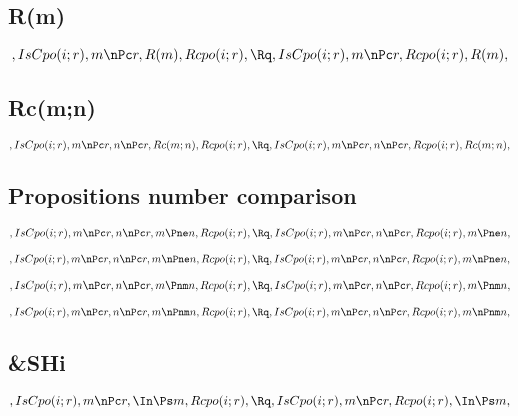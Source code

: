 \bigskip
\bigskip
\subsection{R(m)}
\[, IsCpo(i;r), m \nPc r, R(m), Rcpo(i;r), \Rq ,IsCpo(i;r), m \nPc r, Rcpo(i;r), R(m), \]


\bigskip
\bigskip
\subsection{Rc(m;n)}
\[, IsCpo(i;r), m \nPc r, n \nPc r, Rc(m;n), Rcpo(i;r), \Rq , IsCpo(i;r), m \nPc r, n \nPc r, Rcpo(i;r), Rc(m;n), \]


\bigskip
\bigskip
\subsection{Propositions number comparison}
\[, IsCpo(i;r), m \nPc r, n \nPc r, m \Pne n, Rcpo(i;r), \Rq , IsCpo(i;r), m \nPc r, n \nPc r, Rcpo(i;r), m \Pne n, \]

\[, IsCpo(i;r), m \nPc r, n \nPc r, m \nPne n, Rcpo(i;r), \Rq , IsCpo(i;r), m \nPc r, n \nPc r, Rcpo(i;r), m \nPne n, \]

\[, IsCpo(i;r), m \nPc r, n \nPc r, m \Pnm n, Rcpo(i;r), \Rq , IsCpo(i;r), m \nPc r, n \nPc r, Rcpo(i;r), m \Pnm n, \]

\[, IsCpo(i;r), m \nPc r, n \nPc r, m \nPnm n, Rcpo(i;r), \Rq , IsCpo(i;r), m \nPc r, n \nPc r, Rcpo(i;r), m \nPnm n, \]


\bigskip
\bigskip
\subsection{\&SHi}
\[, IsCpo(i;r), m \nPc r, \In \Ps m, Rcpo(i;r), \Rq ,IsCpo(i;r), m \nPc r, Rcpo(i;r), \In \Ps m, \]



\bigskip
\bigskip
